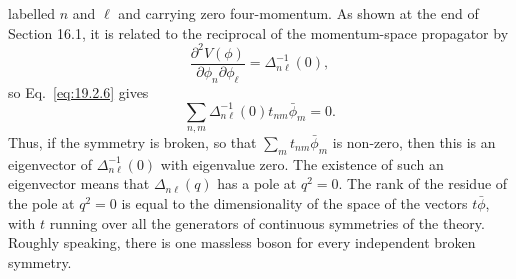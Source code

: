 labelled $n$ and $\ell$ and carrying zero four-momentum. As shown at the end
of Section 16.1, it is related to the reciprocal of the momentum-space
propagator by
\begin{equation}
 \frac{\partial^2V(\phi)}{\partial\phi_n\partial\phi_\ell}
 =\Delta^{-1}_{n\ell}(0),
 \tag{19.2.7}\label{eq:19.2.7}
\end{equation}
so Eq.~\eqref{eq:19.2.6} gives
\begin{equation}
 \sum_{n,m}\Delta^{-1}_{n\ell}(0)t_{nm}\bar\phi_m=0.
 \tag{19.2.8}\label{eq:19.2.8}
\end{equation}
Thus, if the symmetry is broken, so that $\sum_m t_{nm}\bar\phi_m$ is
non-zero, then this is an eigenvector of $\Delta^{-1}_{n\ell}(0)$ with
eigenvalue zero. The existence of such an eigenvector means that
$\Delta_{n\ell}(q)$ has a pole at $q^2=0$. The rank of the residue of the pole
at $q^2=0$ is equal to the dimensionality of the space of the vectors
$t\bar\phi$, with $t$ running over all the generators of continuous
symmetries of the theory. Roughly speaking, there is one massless boson for
every independent broken symmetry.

